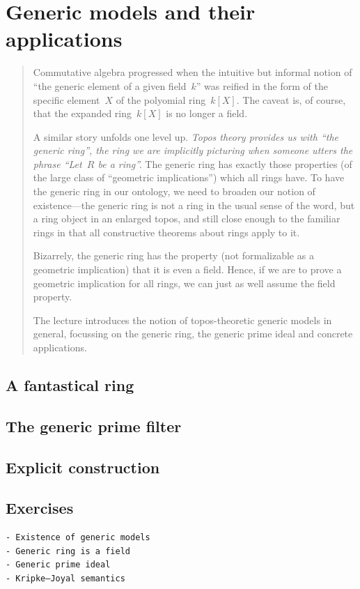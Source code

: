 \documentclass[10pt,reqno,a4paper,openany]{amsbook}
\theoremstyle{definition}
\theoremstyle{plain}
\theoremstyle{remark}
\newcommand{\?}{\,{:}\,}
\renewcommand{\_}{\mathpunct{.}\,}
\newenvironment{intro}{\begin{quote}}{\end{quote}\bigskip}
\begin{document}
\chapter{Generic models and their applications}

\begin{intro}
Commutative algebra progressed when the intuitive but informal notion of
``the generic element of a given field~$k$'' was reified in the form of the
specific element~$X$ of the polyomial ring~$k[X]$. The caveat is, of course,
that the expanded ring~$k[X]$ is no longer a field.

A similar story unfolds one level up. \emph{Topos theory provides us with ``the
generic ring'', the ring we are implicitly picturing when someone utters
the phrase ``Let~$R$ be a ring''.} The generic ring has exactly those
properties (of the large class of ``geometric implications'') which all rings
have. To have the generic ring in our ontology,
we need to broaden our notion of existence---the generic ring is not a
ring in the usual sense of the word, but a ring object in an enlarged
topos, and still close enough to the familiar rings in that all
constructive theorems about rings apply to it.

Bizarrely, the generic ring has the property (not formalizable as a
geometric implication) that it is even a field. Hence, if we are to
prove a geometric implication for all rings, we can just as well assume
the field property.

The lecture introduces the notion of topos-theoretic generic models in
general, focussing on the generic ring, the generic prime ideal and
concrete applications.
\end{intro}


\section{A fantastical ring}
\newpage

\section{The generic prime filter}
\newpage

\section{Explicit construction}
\newpage

\section{Exercises}


\vfill{\small%
\begin{verbatim}
- Existence of generic models
- Generic ring is a field
- Generic prime ideal
- Kripke–Joyal semantics
\end{verbatim}
}

\printbibliography
\end{document}
